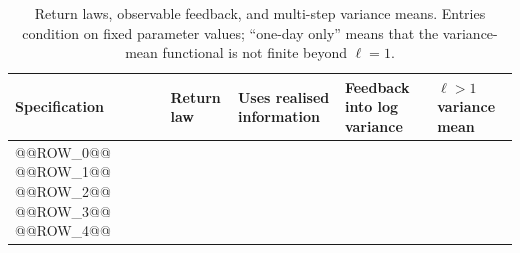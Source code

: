 \begin{table}[htbp]
\centering
\caption{Return laws, observable feedback, and multi-step variance means. Entries condition on fixed parameter values; ``one-day only'' means that the variance-mean functional is not finite beyond $\ell=1$.}
\label{tab:triad}
\small
\begin{tabular}{@{}>{\raggedright\arraybackslash}p{}>{\raggedright\arraybackslash}p{}>{\raggedright\arraybackslash}p{}>{\raggedright\arraybackslash}p{}>{\raggedright\arraybackslash}p{}@{}}
\toprule
Specification & Return law & Uses realised information & Feedback into log variance & $\ell>1$ variance mean \\
\midrule
@@ROW_0@@
@@ROW_1@@
@@ROW_2@@
@@ROW_3@@
@@ROW_4@@
\bottomrule
\end{tabular}
\end{table}
